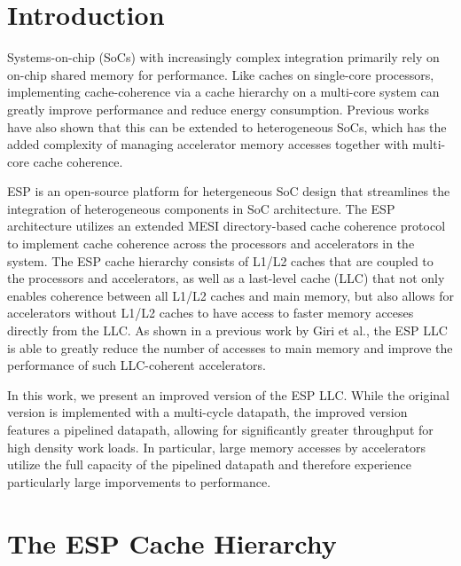 \documentclass{sig-alternate}
\begin{document}
\section{Introduction}
\label{sec:intro}

Systems-on-chip (SoCs) with increasingly complex integration primarily rely on on-chip shared memory for performance. Like caches on single-core processors,
implementing cache-coherence via a cache hierarchy on a multi-core system can greatly improve performance and reduce energy consumption. Previous works have also shown that this can be
extended to heterogeneous SoCs, which has the added complexity of managing accelerator memory accesses together with multi-core cache coherence.
\par ESP is an open-source platform for hetergeneous SoC design that streamlines the integration of heterogeneous components in SoC architecture.
The ESP architecture utilizes an extended MESI directory-based cache coherence protocol to implement cache coherence across the processors and accelerators in the system. The ESP cache hierarchy consists of L1/L2 caches that are coupled
to the processors and accelerators, as well as a last-level cache (LLC) that not only enables coherence between all L1/L2 caches and main memory, but also allows for accelerators without L1/L2 caches to have access to
faster memory acceses directly from the LLC. As shown in a previous work by Giri et al., the ESP LLC is able to greatly reduce the number of accesses to main memory and improve the performance of such LLC-coherent accelerators.
\par In this work, we present an improved version of the ESP LLC. While the original version is implemented with a multi-cycle datapath, the improved version features a pipelined datapath, 
allowing for significantly greater throughput for high density work loads. In particular, large memory accesses by accelerators utilize the full capacity of the pipelined datapath and therefore experience particularly large imporvements 
to performance.

\section{The ESP Cache Hierarchy}
\label{sec:cache}
\end{document}

